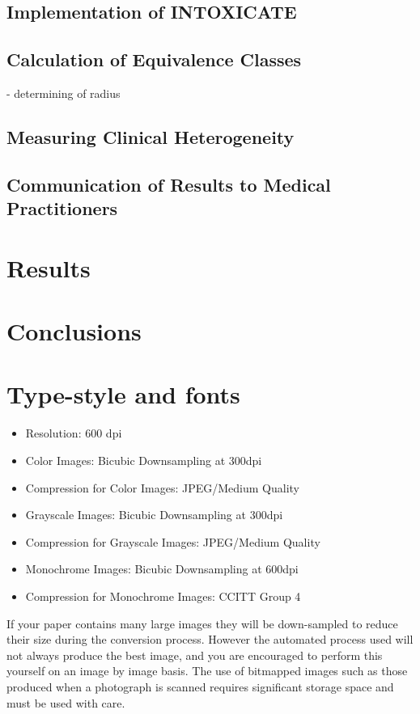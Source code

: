 \documentclass[10pt]{article}
\begin{document}
\subsection{Implementation of INTOXICATE}
\subsection{Calculation of Equivalence Classes}
- determining of radius
\subsection{Measuring Clinical Heterogeneity}
\subsection{Communication of Results to Medical Practitioners}

\section{Results}

\section{Conclusions}

\section{Type-style and fonts}
\label{sec:type-style}

\begin{itemize}
\setlength\itemsep{0em}
\item Resolution: 600 dpi
\item Color Images: Bicubic Downsampling at 300dpi
\item Compression for Color Images: JPEG/Medium Quality
\item Grayscale Images: Bicubic Downsampling at 300dpi
\item Compression for Grayscale Images: JPEG/Medium Quality
\item Monochrome Images: Bicubic Downsampling at 600dpi
\item Compression for Monochrome Images: CCITT Group 4
\end{itemize}

If your paper contains many large images they will be down-sampled to reduce their size during the conversion process.  However the automated process used will not always produce the best image, and you are encouraged to perform this yourself on an image by image basis. The use of bitmapped images such as those produced when a photograph is scanned requires significant storage space and must be used with care.
\end{document}
